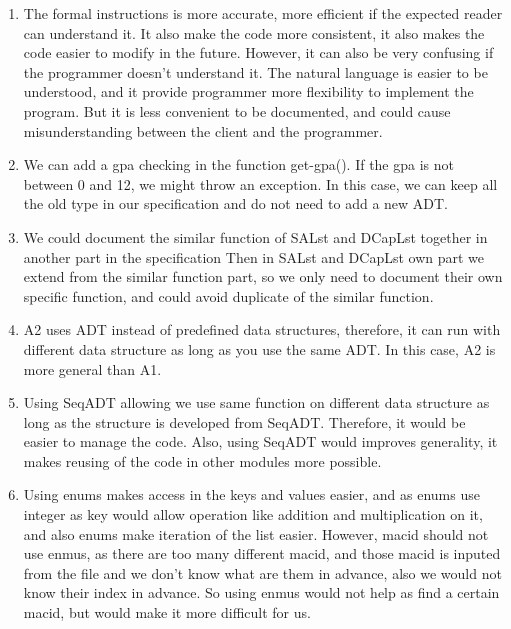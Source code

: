 \documentclass[12pt]{article}
\begin{document}
\begin{enumerate}

\item The formal instructions is more accurate, more efficient if the expected reader can understand it. It  also make the code more consistent, it also makes the code easier to modify in the future. However, it can also be very confusing if the programmer doesn't understand it. The natural language is easier to be understood, and it provide programmer more flexibility to implement the program. But it is less convenient to be documented, and could cause misunderstanding between the client and the programmer.

\item We can add a gpa checking in the function get-gpa(). If the gpa is not between 0 and 12, we might throw an exception. In this case, we can keep all the old type in our specification and do not need to add a new ADT.

\item We could document the similar function of SALst and DCapLst together in another part in the specification Then in SALst and DCapLst own part we extend from the similar function part, so we only need to document their own specific function, and could avoid duplicate of the similar function.

\item A2 uses ADT instead of predefined data structures, therefore,  it can run with different data structure as long as you use the same ADT.  In this case, A2 is more general than A1.

\item Using SeqADT allowing we use same function on different data structure as long as the structure is developed from SeqADT.  Therefore, it would be easier to manage the code. Also, using SeqADT would improves generality, it makes reusing of the code in other modules more possible.

\item Using enums makes access in the keys and values easier, and as enums use integer as key would allow operation like addition and multiplication on it, and also enums make iteration of the list easier. However, macid should not use enmus, as there are too many different macid, and those macid is inputed from the file and we don't know what are them in advance, also we would not know their index in advance. So using enmus would not help as find a certain macid, but would make it more difficult for us.

\end{enumerate}
\end{document}
